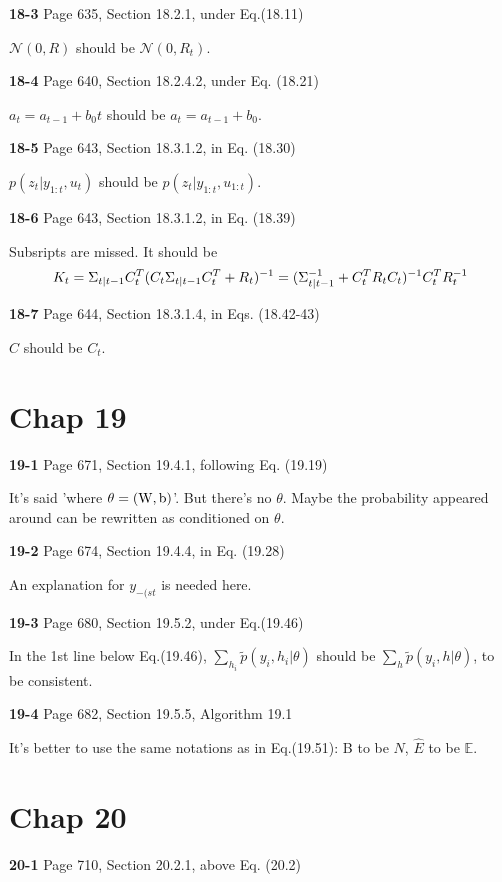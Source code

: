 \documentclass[aps,preprint,a4]{revtex4-1}
\newcommand{\nl}{\nonumber \\}
\begin{document}
{\color{red}\textbf{18-3}} Page 635, Section 18.2.1, under Eq.(18.11)

$\mathcal N(0,R)$ should be $\mathcal N(0,R_{t})$.

{\color{red}\textbf{18-4}} Page 640, Section 18.2.4.2, under Eq. (18.21)

$a_{t}=a_{t-1}+b_{0}t$ should be $a_{t}=a_{t-1}+b_{0}$.

{\color{red}\textbf{18-5}} Page 643, Section 18.3.1.2, in Eq. (18.30)

$p(z_{t}|y_{1:t},u_{t})$ should be $p(z_{t}|y_{1:t},u_{1:t})$.

{\color{red}\textbf{18-6}} Page 643, Section 18.3.1.2, in Eq. (18.39)

Subsripts are missed. It should be
\begin{equation}
K_{t} = \Sigma_{t|t-1}C^{T}_{t}(C_{t}\Sigma_{t|t-1}C^{T}_{t}+R_{t})^{-1}
=(\Sigma_{t|t-1}^{-1} + C^{T}_{t}R_{t}C_{t})^{-1}C^{T}_{t}R^{-1}_{t}\nl
\end{equation}

{\color{red}\textbf{18-7}} Page 644, Section 18.3.1.4, in Eqs. (18.42-43)

$C$ should be $C_{t}$.

\section{Chap 19}
{\color{red}\textbf{19-1}} Page 671, Section 19.4.1, following Eq. (19.19)

It's said 'where $\theta=(\rm W,b)$'. But there's no $\theta$. 
Maybe the probability appeared around can be rewritten as conditioned on $\theta$.

{\color{red}\textbf{19-2}} Page 674, Section 19.4.4, in Eq. (19.28)

An explanation for $y_{-(st}$ is needed here.

{\color{red}\textbf{19-3}} Page 680, Section 19.5.2, under Eq.(19.46)

In the 1st line below  Eq.(19.46), $\sum_{h_{i}}\tilde p(y_{i},h_{i}|\theta)$ should be
$\sum_{h}\tilde p(y_{i},h|\theta)$, to be consistent.

{\color{red}\textbf{19-4}} Page 682, Section 19.5.5, Algorithm 19.1

It's better to use the same notations as in Eq.(19.51): B to be $N$, $\hat E$ to be $\mathbb E$.

\section{Chap 20}
{\color{red}\textbf{20-1}} Page 710, Section 20.2.1, above Eq. (20.2)
\end{document}
